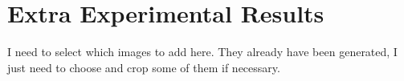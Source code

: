\chapter{Extra Experimental Results}

I need to select which images to add here. They already have been generated, I just need to choose and crop some of them if necessary.